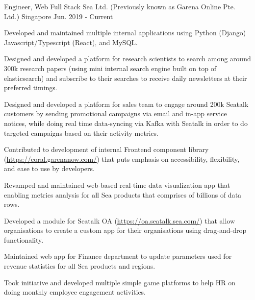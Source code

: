 

\begin{cventries}

  \cventry
    {Engineer, Web Full Stack} %
    {Sea Ltd. (Previously known as Garena Online Pte. Ltd.)} %
    {Singapore} %
    {Jun. 2019 - Current} %
    {
      \begin{cvitems} %
        \item {Developed and maintained multiple internal applications using Python (Django) Javascript/Typescript (React), and MySQL.}
        \item {Designed and developed a platform for research scientists to search among around 300k research papers (using mini internal search engine built on top of elasticsearch) and subscribe to their searches to receive daily newsletters at their preferred timings.}
        \item {Designed and developed a platform for sales team to engage around 200k Seatalk customers by sending promotional campaigns via email and in-app service notices, while doing real time data-syncing via Kafka with Seatalk in order to do targeted campaigns based on their activity metrics.}
        \item {Contributed to development of internal Frontend component library (\url{https://coral.garenanow.com/}) that puts emphasis on accessibility, flexibility, and ease to use by developers.}
        \item {Revamped and maintained web-based real-time data visualization app that enabling metrics analysis for all Sea products that comprises of billions of data rows.}
        \item {Developed a module for Seatalk OA (\url{https://oa.seatalk.sea.com/}) that allow organisations to create a custom app for their organisations using drag-and-drop functionality.}
        \item {Maintained web app for Finance department to update parameters used for revenue statistics for all Sea products and regions.}
        \item {Took initiative and developed multiple simple game platforms to help HR on doing monthly employee engagement activities.}
      \end{cvitems}
    }


\end{cventries}
